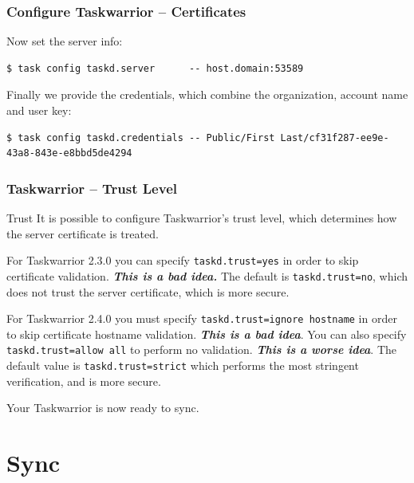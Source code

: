 \documentclass[t,handout]{beamer}
\begin{document}
\begin{frame}[fragile]\frametitle{Configure Taskwarrior -- Certificates}
    Now set the server info:
    \begin{lstlisting}
$ task config taskd.server      -- host.domain:53589\end{lstlisting}

    Finally we provide the credentials, which combine the organization, account name and user key:

    \begin{lstlisting}
$ task config taskd.credentials -- Public/First Last/cf31f287-ee9e-43a8-843e-e8bbd5de4294\end{lstlisting}
\end{frame}

\begin{frame}[fragile]\frametitle{Taskwarrior -- Trust Level}
    \begin{alertblock}{Trust}
        It is possible to configure Taskwarrior's trust level, which determines how the server certificate is treated.

        For Taskwarrior 2.3.0 you can specify \verb+taskd.trust=yes+ in order to skip certificate validation. \textbf{\emph{This is a bad idea.}} The default is \verb+taskd.trust=no+, which does not trust the server certificate, which is more secure.

        For Taskwarrior 2.4.0 you must specify \verb+taskd.trust=ignore hostname+ in order to skip certificate hostname validation. \textbf{\emph{This is a bad idea}}. You can also specify \verb+taskd.trust=allow all+ to perform no validation. \textbf{\emph{This is a worse idea}}. The default value is \verb+taskd.trust=strict+ which performs the most stringent verification, and is more secure.
    \end{alertblock}

    Your Taskwarrior is now ready to sync.
\end{frame}

\section{Sync}
\end{document}
